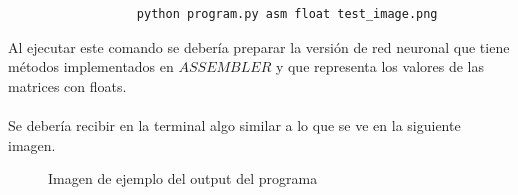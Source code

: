 \begin{verbatim}
                  python program.py asm float test_image.png
\end{verbatim}

Al ejecutar este comando se debería preparar la versión de red neuronal que tiene métodos implementados en $ASSEMBLER$ y que representa los valores de las matrices con floats.
\\
\\
Se debería recibir en la terminal algo similar a lo que se ve en la siguiente imagen.

\fboxsep=1mm%
\fboxrule=2pt%

\begin{figure}[H]
\centering
\caption{Imagen de ejemplo del output del programa}
\centering
\end{figure}